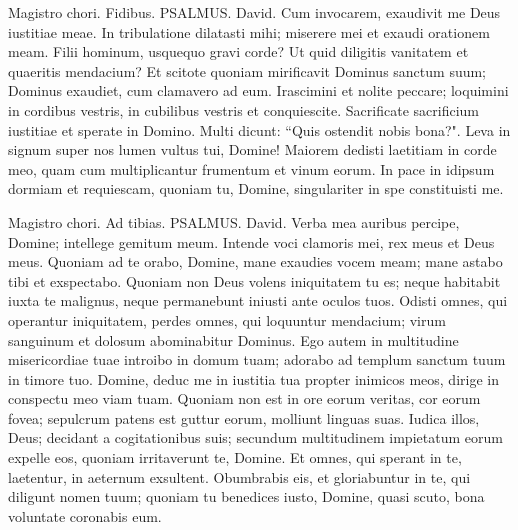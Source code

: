 \begin{biblechapter}  
\verse  Magistro chori. Fidibus. PSALMUS. David. 
\verse Cum invocarem, exaudivit me Deus iustitiae meae. In tribulatione dilatasti mihi; miserere mei et exaudi orationem meam. 
\verse Filii hominum, usquequo gravi corde? Ut quid diligitis vanitatem et quaeritis mendacium? 
\verse Et scitote quoniam mirificavit Dominus sanctum suum; Dominus exaudiet, cum clamavero ad eum. 
\verse Irascimini et nolite peccare; loquimini in cordibus vestris, in cubilibus vestris et conquiescite. 
\verse Sacrificate sacrificium iustitiae et sperate in Domino. 
\verse Multi dicunt: “Quis ostendit nobis bona?". Leva in signum super nos lumen vultus tui, Domine! 
\verse Maiorem dedisti laetitiam in corde meo, quam cum multiplicantur frumentum et vinum eorum. 
\verse In pace in idipsum dormiam et requiescam, quoniam tu, Domine, singulariter in spe constituisti me. 
\end{biblechapter}

\begin{biblechapter}  
\verse  Magistro chori. Ad tibias. PSALMUS. David. 
\verse Verba mea auribus percipe, Domine; intellege gemitum meum. 
\verse Intende voci clamoris mei, rex meus et Deus meus. 
\verse Quoniam ad te orabo, Domine, mane exaudies vocem meam; mane astabo tibi et exspectabo. 
\verse Quoniam non Deus volens iniquitatem tu es; neque habitabit iuxta te malignus, 
\verse neque permanebunt iniusti ante oculos tuos. 
\verse Odisti omnes, qui operantur iniquitatem, perdes omnes, qui loquuntur mendacium; virum sanguinum et dolosum abominabitur Dominus. 
\verse Ego autem in multitudine misericordiae tuae introibo in domum tuam; adorabo ad templum sanctum tuum in timore tuo. 
\verse Domine, deduc me in iustitia tua propter inimicos meos, dirige in conspectu meo viam tuam. 
\verse Quoniam non est in ore eorum veritas, cor eorum fovea; sepulcrum patens est guttur eorum, molliunt linguas suas. 
\verse Iudica illos, Deus; decidant a cogitationibus suis; secundum multitudinem impietatum eorum expelle eos, quoniam irritaverunt te, Domine. 
\verse Et omnes, qui sperant in te, laetentur, in aeternum exsultent. Obumbrabis eis, et gloriabuntur in te, qui diligunt nomen tuum; 
\verse quoniam tu benedices iusto, Domine, quasi scuto, bona voluntate coronabis eum. 
\end{biblechapter}

